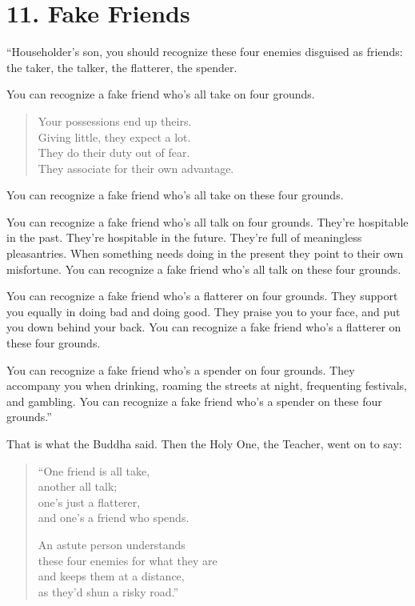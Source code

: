 \documentclass[12pt,openany]{book}%
\begin{document}
\section*{11. Fake Friends }

“Householder’s son, you should recognize these four enemies disguised as friends: the taker, the talker, the flatterer, the spender. 

You can recognize a fake friend who’s all take on four grounds. 

\begin{verse}%
Your possessions end up theirs. \\
Giving little, they expect a lot. \\
They do their duty out of fear. \\
They associate for their own advantage. 

%
\end{verse}

You can recognize a fake friend who’s all take on these four grounds. 

You can recognize a fake friend who’s all talk on four grounds. They’re hospitable in the past. They’re hospitable in the future. They’re full of meaningless pleasantries. When something needs doing in the present they point to their own misfortune. You can recognize a fake friend who’s all talk on these four grounds. 

You can recognize a fake friend who’s a flatterer on four grounds. They support you equally in doing bad and doing good. They praise you to your face, and put you down behind your back. You can recognize a fake friend who’s a flatterer on these four grounds. 

You can recognize a fake friend who’s a spender on four grounds. They accompany you when drinking, roaming the streets at night, frequenting festivals, and gambling. You can recognize a fake friend who’s a spender on these four grounds.” 

That is what the Buddha said. Then the Holy One, the Teacher, went on to say: 

\begin{verse}%
“One friend is all take, \\
another all talk; \\
one’s just a flatterer, \\
and one’s a friend who spends. 

An astute person understands \\
these four enemies for what they are \\
and keeps them at a distance, \\
as they’d shun a risky road.” 

%
\end{verse}
\end{document}
